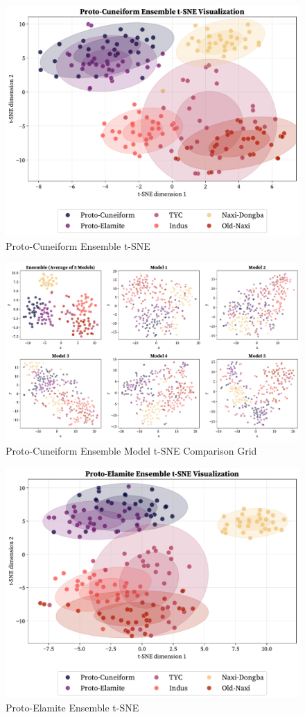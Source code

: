 \documentclass[11pt,a4paper,oneside]{report}
\begin{document}
\begin{figure}[H] 
    \centering
    \includegraphics[width=0.8\linewidth]{Visualizations/t-SNE/Proto-Cuneiform/ensemble_tsne.pdf}
     \caption*{Proto-Cuneiform Ensemble t-SNE}
\end{figure}

\begin{figure}[H] 
    \centering
    \includegraphics[width=1\linewidth]{Visualizations/t-SNE/Proto-Cuneiform/model_comparison_grid.pdf}
     \caption*{Proto-Cuneiform Ensemble Model t-SNE Comparison Grid}
\end{figure}


\begin{figure}[H] 
    \centering
    \includegraphics[width=0.8\linewidth]{Visualizations/t-SNE/Proto-Elamite/ensemble_tsne.pdf}
    \caption*{Proto-Elamite Ensemble t-SNE}
\end{figure}
\end{document}
